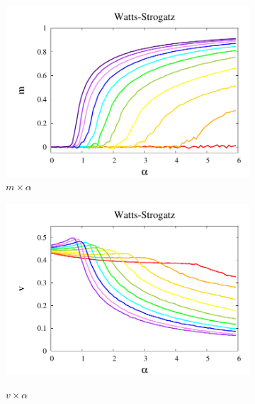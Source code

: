 \begin{figure}
    \centering
    \begin{subfigure}[]{0.45\textwidth}
        \includegraphics[width = \textwidth]{Figures/DeltaXBeta_Mag}
        \caption{$m\times\alpha$}
        \label{fig:fm}
    \end{subfigure}
    \begin{subfigure}[]{0.45\textwidth}
        \includegraphics[width = \textwidth]{Figures/DeltaXBeta_Var}
        \label{fig:fv}
        \caption{$v\times\alpha$}
    \end{subfigure}
    \begin{subfigure}[]{0.45\textwidth}

\end{subfigure}
\end{figure}
